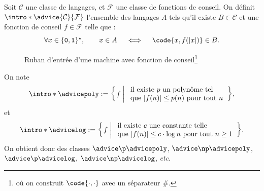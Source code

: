 \documentclass[./main]{subfiles}
\begin{document}
  \begin{defn}
    Soit $\mathcal{C}$ une classe de langages, et $\mathcal{F}$ une classe de fonctions de conseil.
    On définit $\intro*\advice{\mathcal{C}}{\mathcal{F}}$ l'ensemble des langages $A$ tels qu'il existe $B \in \mathcal{C}$ et une fonction de conseil $f \in \mathcal{F}$ telle que :
    \[
      \forall x \in \{\texttt{0},\texttt{1}\}^\star, \quad\quad x \in A \quad \iff \quad \code{x, f(|x|)} \in B
    .\] 
  \end{defn}

  \begin{figure}[H]
    \centering
    \caption{Ruban d'entrée d'une machine avec fonction de conseil\footnote{où on construit $\code{\cdot,\cdot}$ avec un séparateur $\texttt{\#}$.}}
  \end{figure}

  \begin{exm}
    On note
    \[
    \intro*\advicepoly := \mleft\{\,f \;\middle|\;
      \begin{array}{l}
        \text{il existe $p$ un polynôme tel}\\
        \text{que $|f(n)| \le p(n)$ pour tout $n$}
      \end{array}
    \,\mright\}  
    ,\]
    et
    \[
    \intro*\advicelog := \mleft\{\,f \;\middle|\;
      \begin{array}{l}
        \text{il existe $c$ une constante telle}\\
        \text{que $|f(n)| \le c \cdot \log n$ pour tout $n \ge 1$}
      \end{array}
    \,\mright\}  
    .\]
    On obtient donc des classes $\advice \p \advicepoly$, $\advice \np \advicepoly$, $\advice \p \advicelog$, $\advice \np \advicelog$, \textit{etc}.
  \end{exm}
\end{document}
